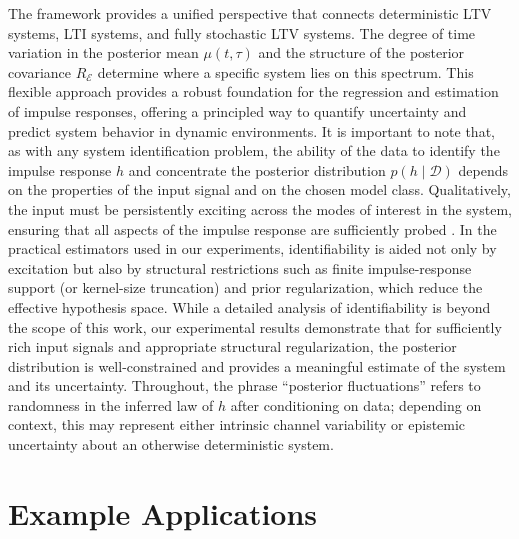\documentclass[preprint,1p,times,authoryear]{elsarticle}
\begin{document}
The framework provides a unified perspective that connects deterministic LTV systems, LTI systems, and fully stochastic LTV systems. The degree of time variation in the posterior mean $\mu(t, \tau)$ and the structure of the posterior covariance $R_{\mathcal{E}}$ determine where a specific system lies on this spectrum. This flexible approach provides a robust foundation for the regression and estimation of impulse responses, offering a principled way to quantify uncertainty and predict system behavior in dynamic environments. It is important to note that, as with any system identification problem, the ability of the data to identify the impulse response $h$ and concentrate the posterior distribution $p(h \mid \mathcal{D})$ depends on the properties of the input signal and on the chosen model class. Qualitatively, the input must be persistently exciting across the modes of interest in the system, ensuring that all aspects of the impulse response are sufficiently probed \citep{Willems2005PE}. In the practical estimators used in our experiments, identifiability is aided not only by excitation but also by structural restrictions such as finite impulse-response support (or kernel-size truncation) and prior regularization, which reduce the effective hypothesis space. While a detailed analysis of identifiability is beyond the scope of this work, our experimental results demonstrate that for sufficiently rich input signals and appropriate structural regularization, the posterior distribution is well-constrained and provides a meaningful estimate of the system and its uncertainty. Throughout, the phrase ``posterior fluctuations'' refers to randomness in the inferred law of $h$ after conditioning on data; depending on context, this may represent either intrinsic channel variability or epistemic uncertainty about an otherwise deterministic system.


\section{Example Applications}
\end{document}
